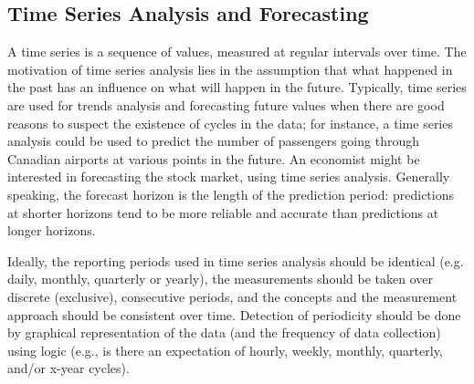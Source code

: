 \subsection{Time Series Analysis and Forecasting}

A time series is a sequence of values, measured at regular intervals over time. The motivation of time series analysis lies in the assumption that what happened in the past has an influence on what will happen in the future. Typically, time series are used for trends analysis and forecasting future values when there are good reasons to suspect the existence of cycles in the data; for instance, a time series analysis could be used to predict the number of passengers going through Canadian airports at various points in the future. An economist might be interested in forecasting the stock market, using time series analysis. Generally speaking, the forecast horizon is the length of the prediction period: predictions at shorter horizons tend to be more reliable and accurate than predictions at longer horizons.

Ideally, the reporting periods used in time series analysis should be identical (e.g. daily, monthly, quarterly or yearly), the measurements should be taken over discrete (exclusive), consecutive periods, and the concepts and the measurement approach should be consistent over time. Detection of periodicity should be done by graphical representation of the data (and the frequency of data collection) using logic (e.g., is there an expectation of hourly, weekly, monthly, quarterly, and/or x-year cycles).

